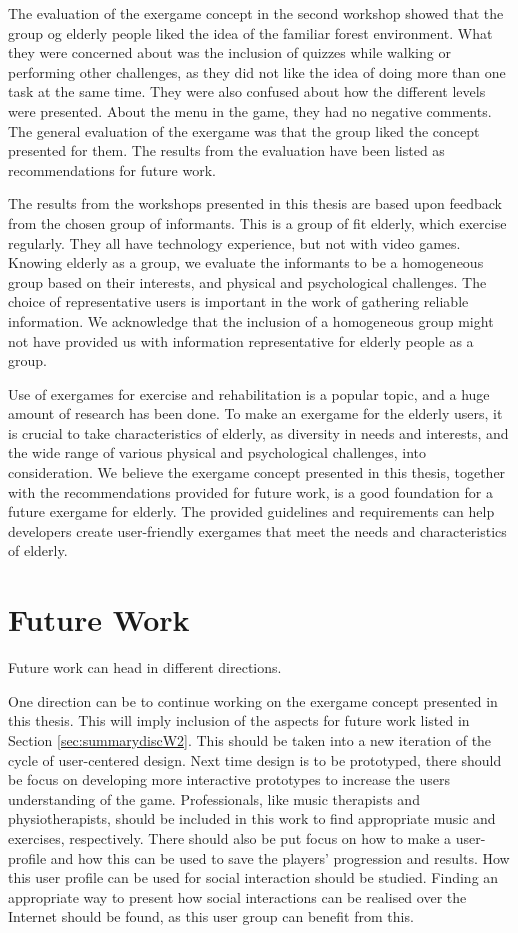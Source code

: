 The evaluation of the exergame concept in the second workshop showed that the group og elderly people liked the idea of the familiar forest environment. What they were concerned about was the inclusion of quizzes while walking or performing other challenges, as they did not like the idea of doing more than one task at the same time. They were also confused about how the different levels were presented. About the menu in the game, they had no negative comments. The general evaluation of the exergame was that the group liked the concept presented for them. The results from the evaluation have been listed as recommendations for future work. 

The results from the workshops presented in this thesis are based upon feedback from the chosen group of informants. This is a group of fit elderly, which exercise regularly. They all have technology experience, but not with video games. Knowing elderly as a group, we evaluate the informants to be a homogeneous group based on their interests, and physical and psychological challenges. The choice of representative users is important in the work of gathering reliable information. We acknowledge that the inclusion of a homogeneous group might not have provided us with information representative for elderly people as a group. 

Use of exergames for exercise and rehabilitation is a popular topic, and a huge amount of research has been done. To make an exergame for the elderly users, it is crucial to take characteristics of elderly, as diversity in needs and interests, and the wide range of various physical and psychological challenges, into consideration. We believe the exergame concept presented in this thesis, together with the recommendations provided for future work, is a good foundation for a future exergame for elderly. The provided guidelines and requirements can help developers create user-friendly exergames that meet the needs and characteristics of elderly.
 
\section{Future Work}

Future work can head in different directions. 

One direction can be to continue working on the exergame concept presented in this thesis. This will imply inclusion of the aspects for future work listed in Section \ref{sec:summarydiscW2}. This should be taken into a new iteration of the cycle of user-centered design. Next time design is to be prototyped, there should be focus on developing more interactive prototypes to increase the users understanding of the game. Professionals, like music therapists and physiotherapists, should be included in this work to find appropriate music and exercises, respectively. There should also be put focus on how to make a user-profile and how this can be used to save the players' progression and results. How this user profile can be used for social interaction should be studied. Finding an appropriate way to present how social interactions can be realised over the Internet should be found, as this user group can benefit from this. 

